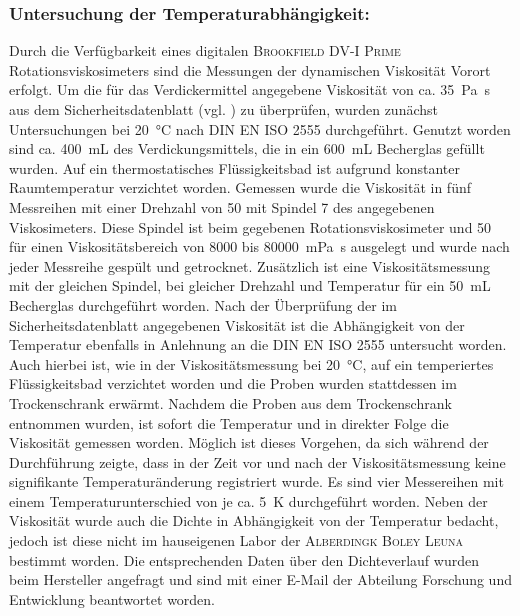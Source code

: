 \subsubsection{Untersuchung der Temperaturabhängigkeit:} 
Durch die Verfügbarkeit eines digitalen \textsc{Brookfield DV-I Prime} Rotationsviskosimeters sind die Messungen der dynamischen Viskosität Vorort erfolgt. Um die für das Verdickermittel angegebene Viskosität von ca. \SI{35}{\pascal \second} aus dem Sicherheitsdatenblatt (vgl. \cite{MunzingChemieGmbH.2020}) zu überprüfen, wurden zunächst Untersuchungen bei \SI{20}{\celsius} nach DIN EN ISO 2555 durchgeführt. Genutzt worden sind ca. \SI{400}{\milli \liter} des Verdickungsmittels, die in ein \SI{600}{\milli \liter} Becherglas gefüllt wurden. Auf ein thermostatisches Flüssigkeitsbad ist aufgrund konstanter Raumtemperatur verzichtet worden. Gemessen wurde die Viskosität in fünf Messreihen mit einer Drehzahl von \SI{50}{\rpm} mit Spindel 7 des angegebenen Viskosimeters. Diese Spindel ist beim gegebenen Rotationsviskosimeter und \SI{50}{\rpm} für einen Viskositätsbereich von 8000 bis \SI{80000}{\milli \pascal \second} ausgelegt und wurde nach jeder Messreihe gespült und getrocknet. 
Zusätzlich ist eine Viskositätsmessung mit der gleichen Spindel, bei gleicher Drehzahl und Temperatur für ein \SI{50}{\milli \liter} Becherglas durchgeführt worden.\linebreak
Nach der Überprüfung der im Sicherheitsdatenblatt angegebenen Viskosität ist die Abhängigkeit von der Temperatur ebenfalls in Anlehnung an die DIN EN ISO 2555 untersucht worden. Auch hierbei ist, wie in der Viskositätsmessung bei \SI{20}{\celsius}, auf ein temperiertes Flüssigkeitsbad verzichtet worden und die Proben wurden stattdessen im Trockenschrank erwärmt. Nachdem die Proben aus dem Trockenschrank entnommen wurden, ist sofort die Temperatur und in direkter Folge die Viskosität gemessen worden. Möglich ist dieses Vorgehen, da sich während der Durchführung zeigte, dass in der Zeit vor und nach der Viskositätsmessung keine signifikante Temperaturänderung registriert wurde. Es sind vier Messereihen mit einem Temperaturunterschied von je ca. \SI{5}{\kelvin} durchgeführt worden.\linebreak
Neben der Viskosität wurde auch die Dichte in Abhängigkeit von der Temperatur bedacht, jedoch ist diese nicht im hauseigenen Labor der \textsc{Alberdingk Boley Leuna} bestimmt worden. Die entsprechenden Daten über den Dichteverlauf wurden beim Hersteller angefragt und sind mit einer E-Mail der Abteilung Forschung und Entwicklung beantwortet worden.

